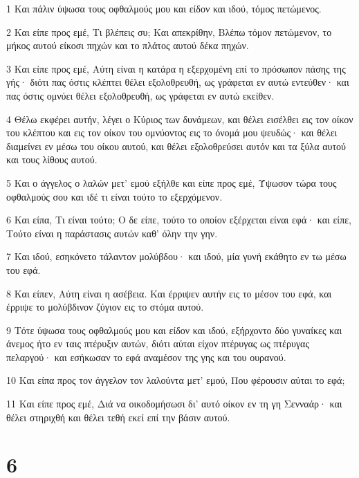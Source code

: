 \par 1 Και πάλιν ύψωσα τους οφθαλμούς μου και είδον και ιδού, τόμος πετώμενος.
\par 2 Και είπε προς εμέ, Τι βλέπεις συ; Και απεκρίθην, Βλέπω τόμον πετώμενον, το μήκος αυτού είκοσι πηχών και το πλάτος αυτού δέκα πηχών.
\par 3 Και είπε προς εμέ, Αύτη είναι η κατάρα η εξερχομένη επί το πρόσωπον πάσης της γής· διότι πας όστις κλέπτει θέλει εξολοθρευθή, ως γράφεται εν αυτώ εντεύθεν· και πας όστις ομνύει θέλει εξολοθρευθή, ως γράφεται εν αυτώ εκείθεν.
\par 4 Θέλω εκφέρει αυτήν, λέγει ο Κύριος των δυνάμεων, και θέλει εισέλθει εις τον οίκον του κλέπτου και εις τον οίκον του ομνύοντος εις το όνομά μου ψευδώς· και θέλει διαμείνει εν μέσω του οίκου αυτού, και θέλει εξολοθρεύσει αυτόν και τα ξύλα αυτού και τους λίθους αυτού.
\par 5 Και ο άγγελος ο λαλών μετ' εμού εξήλθε και είπε προς εμέ, Ύψωσον τώρα τους οφθαλμούς σου και ιδέ τι είναι τούτο το εξερχόμενον.
\par 6 Και είπα, Τι είναι τούτο; Ο δε είπε, τούτο το οποίον εξέρχεται είναι εφά· και είπε, Τούτο είναι η παράστασις αυτών καθ' όλην την γην.
\par 7 Και ιδού, εσηκόνετο τάλαντον μολύβδου· και ιδού, μία γυνή εκάθητο εν τω μέσω του εφά.
\par 8 Και είπεν, Αύτη είναι η ασέβεια. Και έρριψεν αυτήν εις το μέσον του εφά, και έρριψε το μολύβδινον ζύγιον εις το στόμα αυτού.
\par 9 Τότε ύψωσα τους οφθαλμούς μου και είδον και ιδού, εξήρχοντο δύο γυναίκες και άνεμος ήτο εν ταις πτέρυξιν αυτών, διότι αύται είχον πτέρυγας ως πτέρυγας πελαργού· και εσήκωσαν το εφά αναμέσον της γης και του ουρανού.
\par 10 Και είπα προς τον άγγελον τον λαλούντα μετ' εμού, Που φέρουσιν αύται το εφά;
\par 11 Και είπε προς εμέ, Διά να οικοδομήσωσι δι' αυτό οίκον εν τη γη Σενναάρ· και θέλει στηριχθή και θέλει τεθή εκεί επί την βάσιν αυτού.

\chapter{6}

